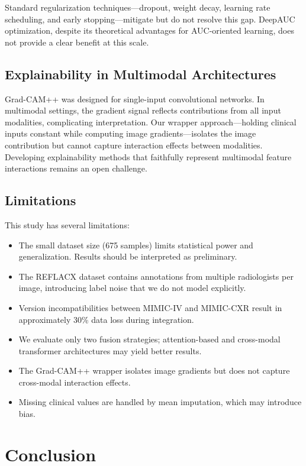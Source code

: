 \documentclass[conference]{IEEEtran}
\begin{document}
Standard regularization techniques---dropout, weight decay, learning rate scheduling, and early stopping---mitigate but do not resolve this gap. DeepAUC optimization, despite its theoretical advantages for AUC-oriented learning, does not provide a clear benefit at this scale.

\subsection{Explainability in Multimodal Architectures}

Grad-CAM++ was designed for single-input convolutional networks. In multimodal settings, the gradient signal reflects contributions from all input modalities, complicating interpretation. Our wrapper approach---holding clinical inputs constant while computing image gradients---isolates the image contribution but cannot capture interaction effects between modalities. Developing explainability methods that faithfully represent multimodal feature interactions remains an open challenge.

\subsection{Limitations}

This study has several limitations:
\begin{itemize}
    \item The small dataset size (675 samples) limits statistical power and generalization. Results should be interpreted as preliminary.
    \item The REFLACX dataset contains annotations from multiple radiologists per image, introducing label noise that we do not model explicitly.
    \item Version incompatibilities between MIMIC-IV and MIMIC-CXR result in approximately 30\% data loss during integration.
    \item We evaluate only two fusion strategies; attention-based and cross-modal transformer architectures may yield better results.
    \item The Grad-CAM++ wrapper isolates image gradients but does not capture cross-modal interaction effects.
    \item Missing clinical values are handled by mean imputation, which may introduce bias.
\end{itemize}

\section{Conclusion}\label{sec:conclusion}
\end{document}
